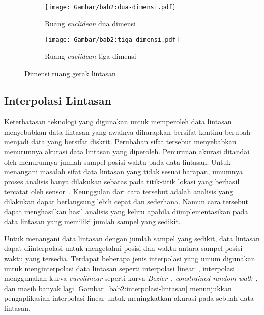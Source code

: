 \iffalse

Pada skripsi ini, entitas yang diamati akan bergerak dalam ruang \textit{euclidean} dua dimensi yang disimbolkan sebagai $\mathbb{R}^2$\lionov{ini harusnya ada di batasan}.

\fi

\begin{figure}[b!]
    \centering
    \begin{subfigure}[h]{0.325\textwidth}
        \centering
        \texttt{[image: Gambar/bab2:dua-dimensi.pdf]}
        \caption{Ruang \textit{euclidean} dua dimensi}
        \label{bab2:dua-dimensi}
    \end{subfigure} \hspace{1.25cm}
    \begin{subfigure}[h]{0.325\textwidth}
        \centering
        \texttt{[image: Gambar/bab2:tiga-dimensi.pdf]}
        \caption{Ruang \textit{euclidean} tiga dimensi}
        \label{bab2:tiga-dimensi}
    \end{subfigure}
    \caption{Dimensi ruang gerak lintasan}
    \label{bab2:ruang-gerak}
\end{figure}

\subsection{Interpolasi Lintasan}
\label{subsec:interpolasi}

Keterbatasan teknologi yang digunakan untuk memperoleh data lintasan menyebabkan data lintasan yang awalnya diharapkan bersifat kontinu berubah menjadi data yang bersifat diskrit. Perubahan sifat tersebut menyebabkan menurunnya akurasi data lintasan yang diperoleh. Penurunan akurasi ditandai oleh menurunnya jumlah sampel posisi-waktu pada data lintasan. Untuk menangani masalah sifat data lintasan yang tidak sesuai harapan, umumnya proses analisis hanya dilakukan sebatas pada titik-titik lokasi yang berhasil tercatat oleh sensor~\cite{wiratma:trajectory}. Keunggulan dari cara tersebut adalah analisis yang dilakukan dapat berlangsung lebih cepat dan sederhana. Namun cara tersebut dapat menghasilkan hasil analisis yang keliru apabila diimplementasikan pada data lintasan yang memiliki jumlah sampel yang sedikit.

Untuk menangani data lintasan dengan jumlah sampel yang sedikit, data lintasan dapat diinterpolasi untuk mengetahui posisi dan waktu antara sampel posisi-waktu yang tersedia. Terdapat beberapa jenis interpolasi yang umum digunakan untuk menginterpolasi data lintasan seperti interpolasi linear~\cite{wiratma:trajectory}, interpolasi menggunakan kurva \textit{curvilinear} seperti kurva \textit{Bezier}~\cite{tremblay:02:curvilinear}, \textit{constrained random walk}~\cite{wentz:02:constrained-random-walk}, dan masih banyak lagi. Gambar~\ref{bab2:interpolasi-lintasan} menunjukkan pengaplikasian interpolasi linear untuk meningkatkan akurasi pada sebuah data lintasan.

